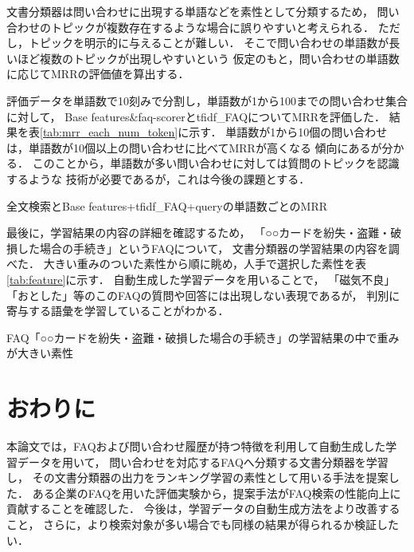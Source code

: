 \documentclass[japanese]{jnlp_1.4}
\begin{document}
文書分類器は問い合わせに出現する単語などを素性として分類するため，
問い合わせのトピックが複数存在するような場合に誤りやすいと考えられる．
ただし，トピックを明示的に与えることが難しい．
そこで問い合わせの単語数が長いほど複数のトピックが出現しやすいという
仮定のもと，問い合わせの単語数に応じてMRRの評価値を算出する．

評価データを単語数で10刻みで分割し，単語数が1から100までの問い合わせ集合に対して，
Base features\&faq-scorerとtfidf\_FAQについてMRRを評価した．
結果を表\ref{tab:mrr_each_num_token}に示す．
単語数が1から10個の問い合わせは，単語数が10個以上の問い合わせに比べてMRRが高くなる
傾向にあるが分かる．
このことから，単語数が多い問い合わせに対しては質問のトピックを認識するような
技術が必要であるが，これは今後の課題とする．

\begin{table}[t]
\caption{全文検索とBase features+tfidf\_FAQ+queryの単語数ごとのMRR}
\label{tab:mrr_each_num_token}

\end{table}

最後に，学習結果の内容の詳細を確認するため，
「○○カードを紛失・盗難・破損した場合の手続き」というFAQについて，
文書分類器の学習結果の内容を調べた．
大きい重みのついた素性から順に眺め，人手で選択した素性を表\ref{tab:feature}に示す．
自動生成した学習データを用いることで，
「磁気不良」「おとした」等のこのFAQの質問や回答には出現しない表現であるが，
判別に寄与する語彙を学習していることがわかる．

\begin{table}[t]
\caption{FAQ「○○カードを紛失・盗難・破損した場合の手続き」の学習結果の中で重みが大きい素性}
\label{tab:feature}

\end{table}


\section{おわりに}

本論文では，FAQおよび問い合わせ履歴が持つ特徴を利用して自動生成した学習データを用いて，
問い合わせを対応するFAQへ分類する文書分類器を学習し，
その文書分類器の出力をランキング学習の素性として用いる手法を提案した．
ある企業のFAQを用いた評価実験から，提案手法がFAQ検索の性能向上に貢献することを確認した．
今後は，学習データの自動生成方法をより改善すること，
さらに，より検索対象が多い場合でも同様の結果が得られるか検証したい．
\end{document}
